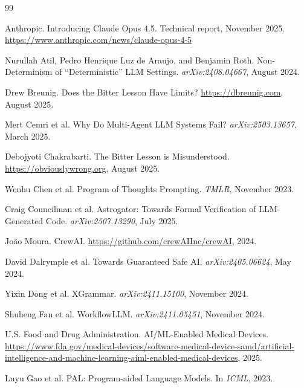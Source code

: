 \documentclass[11pt]{article}
\begin{document}
\begin{thebibliography}{99}

Anthropic. Introducing Claude Opus 4.5. Technical report, November 2025.
\newblock \url{https://www.anthropic.com/news/claude-opus-4-5}

Nurullah Atil, Pedro Henrique Luz de Araujo, and Benjamin Roth.
\newblock Non-Determinism of ``Deterministic'' LLM Settings.
\newblock \emph{arXiv:2408.04667}, August 2024.

Drew Breunig. Does the Bitter Lesson Have Limits? \url{https://dbreunig.com}, August 2025.

Mert Cemri et al. Why Do Multi-Agent LLM Systems Fail? \emph{arXiv:2503.13657}, March 2025.

Debojyoti Chakrabarti. The Bitter Lesson is Misunderstood. \url{https://obviouslywrong.org}, August 2025.

Wenhu Chen et al. Program of Thoughts Prompting. \emph{TMLR}, November 2023.

Craig Councilman et al. Astrogator: Towards Formal Verification of LLM-Generated Code. \emph{arXiv:2507.13290}, July 2025.

Jo\~{a}o Moura. CrewAI. \url{https://github.com/crewAIInc/crewAI}, 2024.

David Dalrymple et al. Towards Guaranteed Safe AI. \emph{arXiv:2405.06624}, May 2024.

Yixin Dong et al. XGrammar. \emph{arXiv:2411.15100}, November 2024.

Shuheng Fan et al. WorkflowLLM. \emph{arXiv:2411.05451}, November 2024.

U.S. Food and Drug Administration. AI/ML-Enabled Medical Devices.
\newblock \url{https://www.fda.gov/medical-devices/software-medical-device-samd/artificial-intelligence-and-machine-learning-aiml-enabled-medical-devices}, 2025.

Luyu Gao et al. PAL: Program-aided Language Models. In \emph{ICML}, 2023.


\end{thebibliography}
\end{document}

